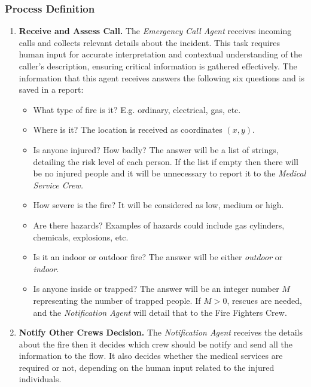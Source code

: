 \subsubsection{Process Definition}
\begin{enumerate}

    \item \textbf{Receive and Assess Call.} 
    The \textit{Emergency Call Agent} receives incoming calls and collects relevant details about the incident. 
    This task requires human input for accurate interpretation and contextual understanding of the caller's description, 
    ensuring critical information is gathered effectively. The information that this agent receives answers the following 
    six questions and is saved in a report:
    \begin{itemize}
        \item What type of fire is it? E.g. ordinary, electrical, gas, etc.
        \item Where is it? The location is received as coordinates \((x, y)\).
        \item Is anyone injured? How badly? The answer will be a list of strings, detailing the risk level of each person. If the list 
        if empty then there will be no injured people and it will be unnecessary to report it to the \textit{Medical Service Crew.}
        \item How severe is the fire? It will be considered as low, medium or high.
        \item Are there hazards? Examples of hazards could include gas cylinders, chemicals, explosions, etc.
        \item Is it an indoor or outdoor fire? The answer will be either \textit{outdoor} or \textit{indoor}.
        \item Is anyone inside or trapped? The answer will be an integer number $M$ representing the number of trapped people. 
        If $M > 0$, rescues are needed, and the \textit{Notification Agent} will detail that to the Fire Fighters Crew.
    \end{itemize}
    

    \item \textbf{Notify Other Crews Decision.} 
    The \textit{Notification Agent} receives the details about the fire then it decides which crew should be notify and send
    all the information to the flow. It also decides whether the medical services are required or not, depending on the 
    human input related to the injured individuals.    

\end{enumerate}


